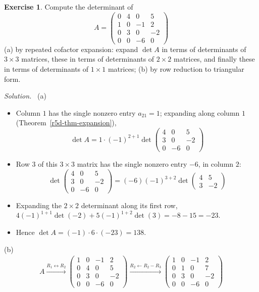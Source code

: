 \documentclass[12pt]{article}
\theoremstyle{definition}
\newtheorem{exercise}{Exercise}
\newenvironment{solution}{\par\noindent\textit{Solution.}\ }{\par\smallskip}
\begin{document}
\begin{exercise}\label{r5d-ex-four-by-four}
Compute the determinant of
\[
A=\begin{pmatrix}0&4&0&5\\1&0&-1&2\\0&3&0&-2\\0&0&-6&0\end{pmatrix}
\]
(a) by repeated cofactor expansion: expand \(\det A\) in terms of determinants of \(3\times3\) matrices, these in terms
of determinants of \(2\times2\) matrices, and finally these in terms of determinants of \(1\times1\) matrices; (b) by
row reduction to triangular form.
\end{exercise}
\begin{solution}
(a)
\begin{itemize}
\item Column \(1\) has the single nonzero entry \(a_{21}=1\); expanding along column \(1\)
(Theorem~\ref{r5d-thm-expansion}),
\[
\det A=1\cdot(-1)^{2+1}\det\begin{pmatrix}4&0&5\\3&0&-2\\0&-6&0\end{pmatrix}
\]
\item Row \(3\) of this \(3\times3\) matrix has the single nonzero entry \(-6\), in column \(2\):
\[
\det\begin{pmatrix}4&0&5\\3&0&-2\\0&-6&0\end{pmatrix}=(-6)(-1)^{3+2}\det\begin{pmatrix}4&5\\3&-2\end{pmatrix}
\]
\item Expanding the \(2\times2\) determinant along its first row,
\(4(-1)^{1+1}\det(-2)+5(-1)^{1+2}\det(3)=-8-15=-23\).
\item Hence \(\det A=(-1)\cdot6\cdot(-23)=138\).
\end{itemize}
(b)
\[
\begin{gathered}
A\xrightarrow{R_1\leftrightarrow R_2}
\begin{pmatrix}1&0&-1&2\\0&4&0&5\\0&3&0&-2\\0&0&-6&0\end{pmatrix}
\xrightarrow{R_2\leftarrow R_2-R_3}
\begin{pmatrix}1&0&-1&2\\0&1&0&7\\0&3&0&-2\\0&0&-6&0\end{pmatrix}

\end{gathered}\]
\end{solution}
\end{document}
